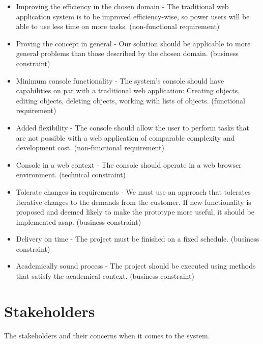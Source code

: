 \begin{itemize}
    \item Improving the efficiency in the chosen domain - The traditional web application system is to be improved efficiency-wise, so power users will be able to use less time on more tasks. (non-functional requirement)
    \item Proving the concept in general - Our solution should be applicable to more general problems than those described by the chosen domain. (business constraint)
    \item Minimum console functionality - The system's console should have capabilities on par with a traditional web application: Creating objects, editing objects, deleting objects, working with lists of objects.  (functional requirement)
    \item Added flexibility - The console should allow the user to perform tasks that are not possible with a web application of comparable complexity and development cost. (non-functional requirement)
    \item Console in a web context - The console should operate in a web browser environment. (technical constraint)
    \item Tolerate changes in requirements - We must use an approach that tolerates iterative changes to the demands from the customer. If new functionality is proposed and deemed likely to make the prototype more useful, it should be implemented asap. (business constraint)
    \item Delivery on time - The project must be finished on a fixed schedule. (business constraint) 
    \item Academically sound process - The project should be executed using methods that satisfy the academical context. (business constraint)
\end{itemize}


\section{Stakeholders} \label{Stakeholders}
The stakeholders and their concerns when it comes to the system.

